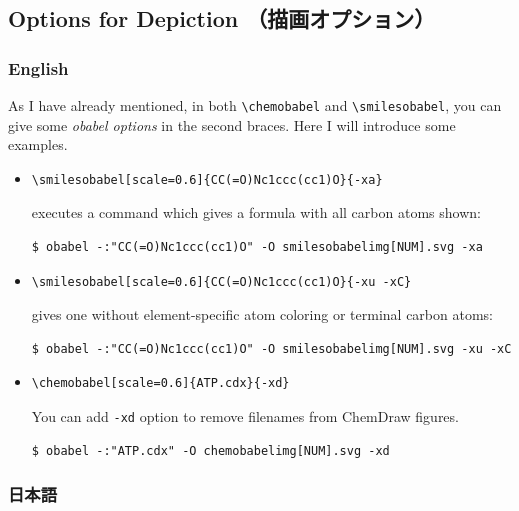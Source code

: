 \documentclass[12pt]{jsarticle}
\begin{document}
\subsection{Options for Depiction （描画オプション）} \label{depict}

\subsubsection{English}

As I have already mentioned, in both \verb|\chemobabel| and \verb|\smilesobabel|, you can give some \textit{obabel options} in the second braces.
Here I will introduce some examples.
\begin{itemize}
\item
\begin{verbatim}
\smilesobabel[scale=0.6]{CC(=O)Nc1ccc(cc1)O}{-xa}
\end{verbatim}
executes a command which gives a formula with all carbon atoms shown:
\begin{verbatim}
$ obabel -:"CC(=O)Nc1ccc(cc1)O" -O smilesobabelimg[NUM].svg -xa
\end{verbatim}
\item
\begin{verbatim}
\smilesobabel[scale=0.6]{CC(=O)Nc1ccc(cc1)O}{-xu -xC}
\end{verbatim}
gives one without element-specific atom coloring or terminal carbon atoms:
\begin{verbatim}
$ obabel -:"CC(=O)Nc1ccc(cc1)O" -O smilesobabelimg[NUM].svg -xu -xC
\end{verbatim}
\item
\begin{verbatim}
\chemobabel[scale=0.6]{ATP.cdx}{-xd}
\end{verbatim}
You can add \texttt{-xd} option to remove filenames from ChemDraw figures.
\begin{verbatim}
$ obabel -:"ATP.cdx" -O chemobabelimg[NUM].svg -xd
\end{verbatim}
\end{itemize}

\subsubsection{日本語}
\end{document}

